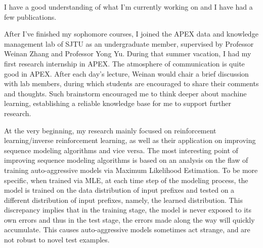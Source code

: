 \documentclass{article}
\begin{document}
      
      I have a good understanding of what I'm currently working on and I have had a few publications.

      After I've finished my sophomore courses, I joined the APEX data and knowledge management lab of SJTU as an undergraduate member, supervised by Professor Weinan Zhang and Professor Yong Yu. During that summer vacation, I had my first research internship in APEX. The atmosphere of communication is quite good in APEX. After each day's lecture, Weinan would chair a brief discussion with lab members, during which students are encouraged to share their comments and thoughts. Such brainstorm encouraged me to think deeper about machine learning, establishing a reliable knowledge base for me to support further research. 

      At the very beginning, my research mainly focused on reinforcement learning/inverse reinforcement learning, as well as their application on improving sequence modeling algorithms and vice versa. The most interesting point of improving sequence modeling algorithms is based on an analysis on the flaw of training auto-aggressive models via Maximum Likelihood Estimation. To be more specific, when trained via MLE, at each time step of the modeling process, the model is trained on the data distribution of input prefixes and tested on a different distribution of input prefixes, namely, the learned distribution. This discrepancy implies that in the training stage, the model is never exposed to its own errors and thus in the test stage, the errors made along the way will quickly accumulate. This causes auto-aggressive models sometimes act strange, and are not robust to novel test examples.
\end{document}
